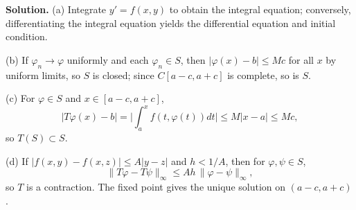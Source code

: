 \noindent\textbf{Solution.}
(a) Integrate $y'=f(x,y)$ to obtain the integral equation; conversely, differentiating the integral equation yields the differential equation and initial condition.

(b) If $\varphi_n\to\varphi$ uniformly and each $\varphi_n\in S$, then $|\varphi(x)-b|\le Mc$ for all $x$ by uniform limits, so $S$ is closed; since $C[a-c,a+c]$ is complete, so is $S$.

(c) For $\varphi\in S$ and $x\in[a-c,a+c]$,
\[|T\varphi(x)-b|=\Big|\int_a^x f(t,\varphi(t))dt\Big|\le M|x-a|\le Mc,
\]
so $T(S)\subset S$.

(d) If $|f(x,y)-f(x,z)|\le A|y-z|$ and $h<1/A$, then for $\varphi,\psi\in S$,
\[\|T\varphi-T\psi\|_\infty\le A h\,\|\varphi-\psi\|_\infty,
\]
so $T$ is a contraction. The fixed point gives the unique solution on $(a-c,a+c)$.
\medskip
